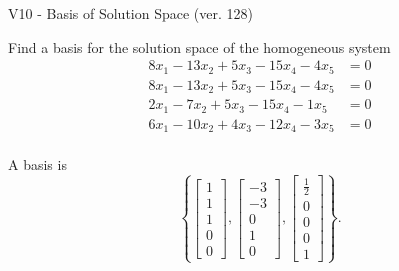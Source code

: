 \begin{exercise}
  \begin{exerciseTitle}V10 - Basis of Solution Space (ver. 128)\end{exerciseTitle}
  \begin{exerciseStatement}
    Find a basis for the solution space of the homogeneous system 
\begin{align*}
 8 x_ 1 -13 x_ 2 + 5 x_ 3 -15 x_ 4 -4 x_ 5 &= 0  \\ 
  8 x_ 1 -13 x_ 2 + 5 x_ 3 -15 x_ 4 -4 x_ 5 &= 0  \\ 
  2 x_ 1 -7 x_ 2 + 5 x_ 3 -15 x_ 4 -1 x_ 5 &= 0  \\ 
  6 x_ 1 -10 x_ 2 + 4 x_ 3 -12 x_ 4 -3 x_ 5 &= 0  \\ 
 \end{align*}


 
  \end{exerciseStatement}

  \begin{exerciseAnswer}
   A basis is   
\[\left\{\left[\begin{array}{c}
1 \\
1 \\
1 \\
0 \\
0
\end{array}\right] , \left[\begin{array}{c}
-3 \\
-3 \\
0 \\
1 \\
0
\end{array}\right] , \left[\begin{array}{c}
\frac{1}{2} \\
0 \\
0 \\
0 \\
1
\end{array}\right]\right\}.\]

  


  \end{exerciseAnswer}
\end{exercise}